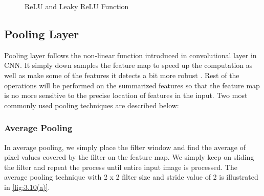 \begin{figure}%
    \centering
    \qquad
    \caption{ReLU and Leaky ReLU Function}%
    \label{fig:3.9}%
\end{figure}

\subsection{Pooling Layer}
Pooling layer follows the non-linear function introduced in convolutional layer 
in CNN. It simply down samples the feature map to 
speed up the computation as well as make some of the features it detects a bit 
more robust \cite{chap_3_article:4}. Rest of the operations will be performed on the summarized features so that the feature map is no more sensitive to the
 precise location of features in the input. Two most 
commonly used pooling techniques are described below:

\subsubsection{Average Pooling}

In average pooling, we simply place the filter window and 
find the average of pixel values covered by the filter on 
the feature map. We simply keep on sliding the filter and repeat 
the process until entire input image is processed. The average pooling 
technique with 2 x 2 filter size and 
stride value of 2 is illustrated in \ref{fig:3.10(a)}.

